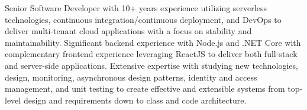 \par{
    Senior Software Developer with 10+ years experience utilizing serverless technologies, continuous integration/continuous deployment, and DevOps to deliver multi-tenant cloud applications with a focus on stability and maintainability. Significant backend experience with Node.js and .NET Core with complementary frontend experience leveraging ReactJS to deliver both full-stack and server-side applications. Extensive expertise with studying new technologies, design, monitoring, asynchronous design patterns, identity and access management, and unit testing to create effective and extensible systems from top-level design and requirements down to class and code architecture.
}

